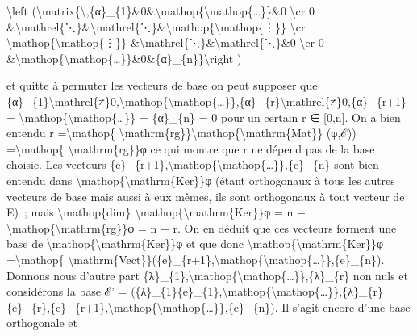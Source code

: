 \documentclass[]{article}
\begin{document}
\textbackslash{}left
(\textbackslash{}matrix\{\textbackslash{},\{α\}\_\{1\}\&0\&\textbackslash{}mathop\{\textbackslash{}mathop\{\ldots{}\}\}\&0
\textbackslash{}cr 0
\&\textbackslash{}mathrel\{⋱\}\&\textbackslash{}mathrel\{⋱\}\&\textbackslash{}mathop\{\textbackslash{}mathop\{⋮\}\}
\textbackslash{}cr \textbackslash{}mathop\{\textbackslash{}mathop\{⋮\}\}
\&\textbackslash{}mathrel\{⋱\}\&\textbackslash{}mathrel\{⋱\}\&0
\textbackslash{}cr 0
\&\textbackslash{}mathop\{\textbackslash{}mathop\{\ldots{}\}\}\&0\&\{α\}\_\{n\}\}\textbackslash{}right
)

et quitte à permuter les vecteurs de base on peut supposer que
\{α\}\_\{1\}\textbackslash{}mathrel\{≠\}0,\textbackslash{}mathop\{\textbackslash{}mathop\{\ldots{}\}\},\{α\}\_\{r\}\textbackslash{}mathrel\{≠\}0,\{α\}\_\{r+1\}
= \textbackslash{}mathop\{\textbackslash{}mathop\{\ldots{}\}\} =
\{α\}\_\{n\} = 0 pour un certain r ∈ {[}0,n{]}. On a bien entendu r
=\textbackslash{}mathop\{
\textbackslash{}mathrm\{rg\}\}\textbackslash{}mathop\{\textbackslash{}mathrm\{Mat\}\}
(φ,ℰ)) =\textbackslash{}mathop\{ \textbackslash{}mathrm\{rg\}\}φ ce qui
montre que r ne dépend pas de la base choisie. Les vecteurs
\{e\}\_\{r+1\},\textbackslash{}mathop\{\textbackslash{}mathop\{\ldots{}\}\},\{e\}\_\{n\}
sont bien entendu dans
\textbackslash{}mathop\{\textbackslash{}mathrm\{Ker\}\}φ (étant
orthogonaux à tous les autres vecteurs de base mais aussi à eux mêmes,
ils sont orthogonaux à tout vecteur de E)~; mais
\textbackslash{}mathop\{dim\}
\textbackslash{}mathop\{\textbackslash{}mathrm\{Ker\}\}φ = n
−\textbackslash{}mathop\{\textbackslash{}mathrm\{rg\}\}φ = n − r. On en
déduit que ces vecteurs forment une base de
\textbackslash{}mathop\{\textbackslash{}mathrm\{Ker\}\}φ et que donc
\textbackslash{}mathop\{\textbackslash{}mathrm\{Ker\}\}φ
=\textbackslash{}mathop\{
\textbackslash{}mathrm\{Vect\}\}(\{e\}\_\{r+1\},\textbackslash{}mathop\{\textbackslash{}mathop\{\ldots{}\}\},\{e\}\_\{n\}).
Donnons nous d'autre part
\{λ\}\_\{1\},\textbackslash{}mathop\{\textbackslash{}mathop\{\ldots{}\}\},\{λ\}\_\{r\}
non nuls et considérons la base ℰ' =
(\{λ\}\_\{1\}\{e\}\_\{1\},\textbackslash{}mathop\{\textbackslash{}mathop\{\ldots{}\}\},\{λ\}\_\{r\}\{e\}\_\{r\},\{e\}\_\{r+1\},\textbackslash{}mathop\{\textbackslash{}mathop\{\ldots{}\}\},\{e\}\_\{n\}).
Il s'agit encore d'une base orthogonale et
\end{document}
